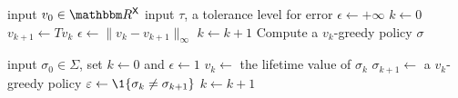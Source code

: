 \documentclass[dvipsnames]{beamer}
\begin{document}
\begin{frame}

    {\small 
        \begin{algorithm}[H]
        \DontPrintSemicolon
        \vspace{0.2em}
        input $v_0 \in \RR^\Xsf$ \;
        \vspace{0.2em}
        input $\tau$, a tolerance level for error \;
        \vspace{0.2em}
        $\epsilon \leftarrow +\infty$ \;
        \vspace{0.2em}
        $k \leftarrow 0$ \;
        \vspace{0.2em}
        \While{$\epsilon > \tau $}
        {
        \vspace{0.2em}
            $v_{k+1} \leftarrow Tv_k$ \;
            \vspace{0.2em}
            $\epsilon \leftarrow \| v_k - v_{k+1} \|_\infty$ \;
            \vspace{0.2em}
            $k \leftarrow k + 1$ \;
        \vspace{0.2em}
        }
        \vspace{0.2em}
        Compute a $v_k$-greedy policy $\sigma$ \;
        \vspace{0.2em}
        \Return{$\sigma$}
        \vspace{0.2em}
        \caption{VFI}
        \end{algorithm}
    }


\end{frame}



\begin{frame}
    

    \begin{algorithm}[H]
        \DontPrintSemicolon
        \vspace{0.5em}
        input $\sigma_0 \in \Sigma$, set $k \leftarrow 0$ and $\epsilon \leftarrow 1$ \;
        \vspace{0.5em}
        {
            $v_k \leftarrow $ the lifetime value of $\sigma_k$ \;
        \vspace{0.5em}
            $\sigma_{k+1} \leftarrow $ a $v_k$-greedy policy \;
        \vspace{0.5em}
            $\epsilon \leftarrow \1\{ \sigma_k \not= \sigma_{k+1} \}$ \;
        \vspace{0.5em}
            $k \leftarrow k + 1$ \;
        }
        \vspace{0.5em}
        \caption{HPI}
    \end{algorithm}

\end{frame}
\end{document}
